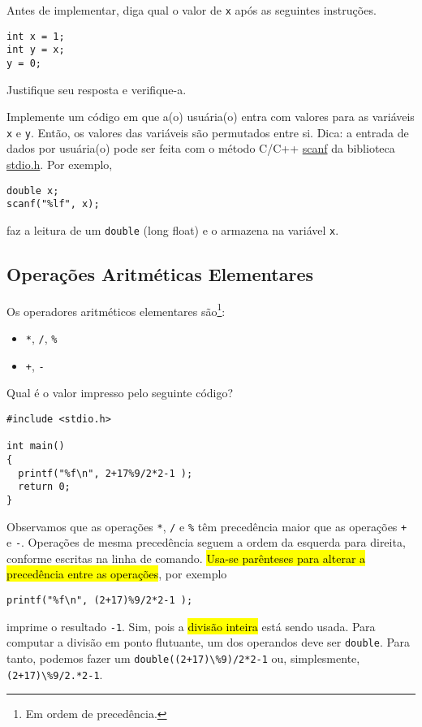 \documentclass[12pt]{article}
\begin{document}
\begin{exr}
  Antes de implementar, diga qual o valor de \lstinline+x+ após as seguintes instruções.
\begin{lstlisting}
int x = 1;
int y = x;
y = 0;
\end{lstlisting}
  Justifique seu resposta e verifique-a.
\end{exr}

\begin{exr}
  Implemente um código em que a(o) usuária(o) entra com valores para as variáveis \lstinline+x+ e \lstinline+y+. Então, os valores das variáveis são permutados entre si. Dica: a entrada de dados por usuária(o) pode ser feita com o método C/C++ \href{https://cplusplus.com/reference/cstdio/scanf}{scanf} da biblioteca \href{https://cplusplus.com/reference/cstdio}{stdio.h}. Por exemplo,
\begin{lstlisting}
double x;
scanf("%lf", x);
\end{lstlisting}
faz a leitura de um \lstinline+double+ (long float) e o armazena na variável \lstinline+x+.
\end{exr}

\subsection{Operações Aritméticas Elementares}

Os operadores aritméticos elementares são\footnote{Em ordem de precedência.}:
\begin{itemize}
\item[] {\lstinline!*!}, {\lstinline!/!}, {\texttt{\%}} 
\item[] {\lstinline!+!}, {\lstinline!-!} 
\end{itemize}

\begin{ex}
  Qual é o valor impresso pelo seguinte código?
\begin{lstlisting}
#include <stdio.h>

int main()
{
  printf("%f\n", 2+17%9/2*2-1 );
  return 0;
}
\end{lstlisting}

  Observamos que as operações {\lstinline+*+}, {\lstinline+/+} e {\texttt{\%}} têm precedência maior que as operações {\lstinline!+!} e {\lstinline!-!}. Operações de mesma precedência seguem a ordem da esquerda para direita, conforme escritas na linha de comando. \hl{Usa-se parênteses para alterar a precedência entre as operações}, por exemplo
\begin{lstlisting}
printf("%f\n", (2+17)%9/2*2-1 );
\end{lstlisting}
imprime o resultado \lstinline!-1!. Sim, pois a \hl{divisão inteira} está sendo usada. Para computar a divisão em ponto flutuante, um dos operandos deve ser \lstinline!double!. Para tanto, podemos fazer um  \lstinline!double((2+17)\%9)/2*2-1! ou, simplesmente, \lstinline!(2+17)\%9/2.*2-1!.
\end{ex}
\end{document}
